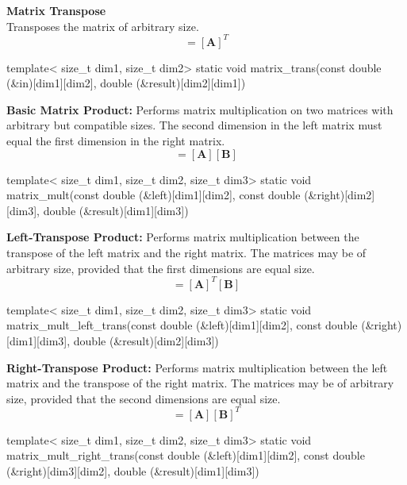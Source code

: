 \documentclass[11pt,fleqn]{report}
\begin{document}
\textbf{Matrix Transpose}\\
Transposes the matrix of arbitrary size.
\begin{equation*}
[\textbf{Y}] = [\textbf{A}]^T
\end{equation*}
\begin{code}
template< size_t dim1, size_t dim2>
static void matrix_trans(const double (&in)[dim1][dim2],
                         double (&result)[dim2][dim1])
\end{code}

\textbf{Basic Matrix Product:}
Performs matrix multiplication on two matrices with arbitrary but 
compatible sizes. The second dimension in the left matrix must equal
the first dimension in the right matrix.
\begin{equation*}
[\textbf{Y}] = [\textbf{A}] [\textbf{B}]
\end{equation*}
\begin{code}
template< size_t dim1, size_t dim2, size_t dim3>
static void matrix_mult(const double (&left)[dim1][dim2],
                        const double (&right)[dim2][dim3],
                        double (&result)[dim1][dim3])
\end{code}

\textbf{Left-Transpose Product:}
Performs matrix multiplication between the transpose of the left matrix 
and the right matrix. The matrices may be of arbitrary size, provided that
the first dimensions are equal size.
\begin{equation*}
[\textbf{Y}] = [\textbf{A}]^T [\textbf{B}]
\end{equation*}
\begin{code}
template< size_t dim1, size_t dim2, size_t dim3>
static void matrix_mult_left_trans(const double (&left)[dim1][dim2],
                                   const double (&right)[dim1][dim3],
                                   double (&result)[dim2][dim3])
\end{code}

\textbf{Right-Transpose Product:}
Performs matrix multiplication between the left matrix and the transpose of 
the right matrix. The matrices may be of arbitrary size, provided that
the second dimensions are equal size.
\begin{equation*}
[\textbf{Y}] = [\textbf{A}] [\textbf{B}]^T
\end{equation*}
\begin{code}
template< size_t dim1, size_t dim2, size_t dim3>
static void matrix_mult_right_trans(const double (&left)[dim1][dim2],
                                    const double (&right)[dim3][dim2],
                                    double (&result)[dim1][dim3])
\end{code}
\end{document}
